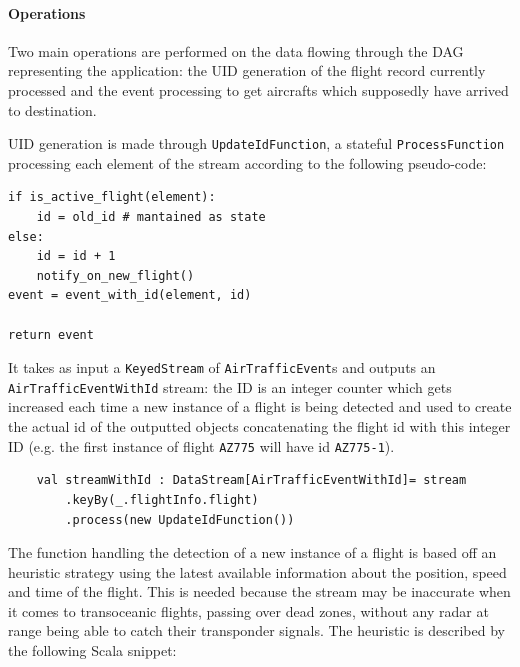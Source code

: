 \paragraph{Operations}

Two main operations are performed on the data flowing through the DAG representing the application: the UID generation of the flight record currently processed and the event processing to get aircrafts which supposedly have arrived to destination.

UID generation is made through \texttt{UpdateIdFunction}, a stateful \texttt{ProcessFunction} processing each element of the stream according to the following pseudo-code:

\begin{verbatim}
if is_active_flight(element):
    id = old_id # mantained as state
else:
    id = id + 1
    notify_on_new_flight()
event = event_with_id(element, id)

return event
\end{verbatim}

It takes as input a \texttt{KeyedStream} of \texttt{AirTrafficEvent}s and outputs an \texttt{AirTrafficEventWithId} stream: the ID is an integer counter which gets increased each time a new instance of a flight is being detected and used to create the actual id of the outputted objects concatenating the flight id with this integer ID (e.g. the first instance of flight \texttt{AZ775} will have id \texttt{AZ775-1}). 

\begin{code}
    \begin{verbatim}
    val streamWithId : DataStream[AirTrafficEventWithId]= stream
        .keyBy(_.flightInfo.flight)
        .process(new UpdateIdFunction())
    \end{verbatim}
\end{code}

The function handling the detection of a new instance of a flight is based off an heuristic strategy using the latest available information about the position, speed and time of the flight. This is needed because the stream may be inaccurate when it comes to transoceanic flights, passing over dead zones, without any radar at range being able to catch their transponder signals. The heuristic is described by the following Scala snippet:

